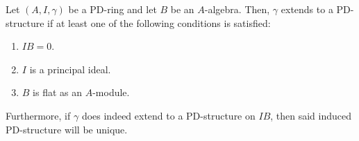                 \begin{proposition} \label{prop: induced_PD_structures_existence_and_uniqueness}
                    Let $(A, I, \gamma)$ be a PD-ring and let $B$ be an $A$-algebra. Then, $\gamma$ extends to a PD-structure if at least one of the following conditions is satisfied:
                        \begin{enumerate}
                            \item $IB = 0$.
                            \item $I$ is a principal ideal.
                            \item $B$ is flat as an $A$-module.
                        \end{enumerate}
                    Furthermore, if $\gamma$ does indeed extend to a PD-structure on $IB$, then said induced PD-structure will be unique.
                \end{proposition}
